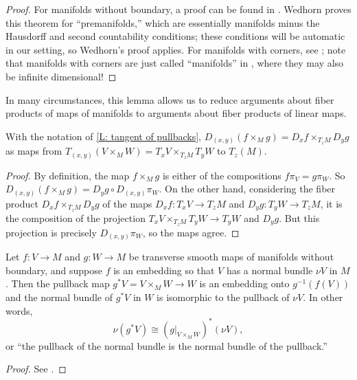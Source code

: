 \begin{proof}
For manifolds without boundary, a proof can be found in \cite[Theorem 5.47]{Wed16}.
Wedhorn proves this theorem for ``premanifolds,'' which are essentially manifolds minus the Hausdorff and second countability conditions; these conditions will be automatic in our setting, so Wedhorn's proof applies.
For manifolds with corners, see \cite[Proposition 7.2.7.c]{MaDo92}; note that manifolds with corners are just called ``manifolds'' in \cite{MaDo92}, where they may also be infinite dimensional!
\end{proof}

In many circumstances, this lemma allows us to reduce arguments about fiber products of maps of manifolds to arguments about fiber products of linear maps.

\begin{corollary}\label{C: tangent map of pullbacks}
With the notation of \cref{L: tangent of pullbacks}, $D_{(x,y)}(f\times_Mg)=D_xf \times_{T_zM} D_yg$ as maps from $T_{(x,y)}(V \times_M W) = T_xV \times_{T_zM} T_yW$ to $T_z(M)$.
\end{corollary}
\begin{proof}
By definition, the map $f \times_M g$ is either of the compositions $f \pi_V = g \pi_W$. So $D_{(x,y)} (f \times_M g) = D_yg \circ D_{(x,y)} \pi_W$. On the other hand, considering the fiber product $D_xf \times_{T_z M} D_y g$ of the maps $D_x f \colon T_xV \to T_zM$ and $D_y g \colon T_yW \to T_zM$, it is the composition of the projection $T_xV \times_{T_zM} T_yW \to  T_yW$ and $D_y g$. 
But this projection is precisely $D_{(x,y)} \pi_W$, so the maps agree.
\end{proof}


\begin{lemma}\label{L: normal pullback}
	Let $f \colon V \to M$ and $g \colon W \to M$ be transverse smooth maps of manifolds without boundary, and suppose $f$ is an embedding so that $V$ has a normal bundle $\nu V$ in $M$.
	Then the pullback map $g^*V = V \times_MW \to W$ is an embedding onto $g^{-1}(f(V))$ and the normal bundle of $g^*V$ in $W$ is isomorphic to the pullback of $\nu V$.
	In other words,
	$$\nu(g^*V) \cong \left(g|_{V\times_M W}\right)^*(\nu V),$$
	or ``the pullback of the normal bundle is the normal bundle of the pullback.''
\end{lemma}

\begin{proof}
	See \cite[Proposition IV.1.4]{Kos93}.
\end{proof}

